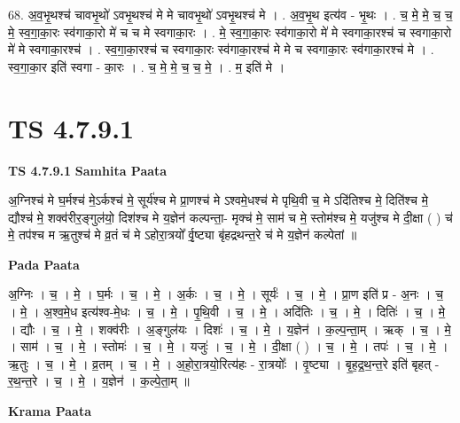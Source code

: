 \documentclass[17pt]{extarticle}
\begin{document}
68. अ॒व॒भृ॒थश्च॑ चावभृ॒थो॑ ऽवभृ॒थश्च॑ मे मे चावभृ॒थो॑ ऽवभृ॒थश्च॑ मे । . अ॒व॒भृ॒थ इत्य॑व - भृ॒थः । . च॒ मे॒ मे॒ च॒ च॒ मे॒ स्व॒गा॒का॒रः स्व॑गाका॒रो मे॑ च च मे स्वगाका॒रः । . मे॒ स्व॒गा॒का॒रः स्व॑गाका॒रो मे॑ मे स्वगाका॒रश्च॑ च स्वगाका॒रो मे॑ मे स्वगाका॒रश्च॑ । . स्व॒गा॒का॒रश्च॑ च स्वगाका॒रः स्व॑गाका॒रश्च॑ मे मे च स्वगाका॒रः स्व॑गाका॒रश्च॑ मे । . स्व॒गा॒का॒र इति॑ स्वगा - का॒रः । . च॒ मे॒ मे॒ च॒ च॒ मे॒ । . म॒ इति॑ मे । \newline
\pagebreak
{}

\section{ TS 4.7.9.1 }

\textbf{TS 4.7.9.1 } \newline
\textbf{Samhita Paata} \newline

अ॒ग्निश्च॑ मे घ॒र्मश्च॑ मे॒ऽर्कश्च॑ मे॒ सूर्य॑श्च मे प्रा॒णश्च॑ मे ऽश्वमे॒धश्च॑ मे पृथि॒वी च॒ मे ऽदि॑तिश्च मे॒ दिति॑श्च मे॒ द्यौश्च॑ मे॒ शक्व॑रीर॒ङ्गुल॑यो॒ दिश॑श्च मे     य॒ज्ञेन॑ कल्पन्ता॒- मृक्च॑ मे॒ साम॑ च मे॒ स्तोम॑श्च मे॒ यजु॑श्च मे दी॒क्षा ( ) च॑ मे॒ तप॑श्च म ऋ॒तुश्च॑ मे व्र॒तं च॑ मे ऽहोरा॒त्रयो᳚ र्वृ॒ष्ट्या बृ॑हद्रथन्त॒रे च॑ मे य॒ज्ञेन॑ कल्पेतां ॥ \newline

\textbf{Pada Paata} \newline

अ॒ग्निः । च॒ । मे॒ । घ॒र्मः । च॒ । मे॒ । अ॒र्कः । च॒ । मे॒ । सूर्यः॑ । च॒ । मे॒ । प्रा॒ण इति॑ प्र - अ॒नः । च॒ । मे॒ । अ॒श्व॒मे॒ध इत्य॑श्व-मे॒धः । च॒ । मे॒ । पृ॒थि॒वी । च॒ । मे॒ । अदि॑तिः । च॒ । मे॒ । दितिः॑ । च॒ । मे॒ । द्यौः । च॒ । मे॒ । शक्व॑रीः । अ॒ङ्गुल॑यः । दिशः॑ । च॒ । मे॒ । य॒ज्ञेन॑ । क॒ल्प॒न्ता॒म् । ऋक् । च॒ । मे॒ । साम॑ । च॒ । मे॒ । स्तोमः॑ । च॒ । मे॒ । यजुः॑ । च॒ । मे॒ । दी॒क्षा ( ) । च॒ । मे॒ । तपः॑ । च॒ । मे॒ । ऋ॒तुः । च॒ । मे॒ । व्र॒तम् । च॒ । मे॒ । अ॒हो॒रा॒त्रयो॒रित्य॑हः - रा॒त्रयोः᳚ । वृ॒ष्ट्या । बृ॒ह॒द्र॒थ॒न्त॒रे इति॑ बृहत् - र॒थ॒न्त॒रे । च॒ । मे॒ । य॒ज्ञेन॑ । क॒ल्पे॒ता॒म् ॥  \newline


\textbf{Krama Paata} \newline
\end{document}
